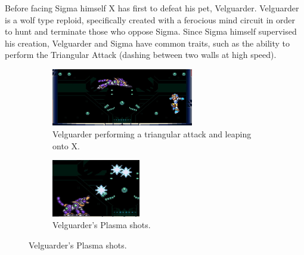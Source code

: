 Before facing Sigma himself X has first to defeat his pet, Velguarder.
Velguarder is a wolf type reploid, specifically created with a ferocious mind circuit in order to hunt and terminate those who oppose Sigma. Since Sigma himself supervised his creation, Velguarder and Sigma have common traits, such as the ability to perform the Triangular Attack (dashing between two walls at high speed).
\begin{figure}[htp]
	\centering
	\begin{subfigure}[t]{.49\linewidth}
		\centering
		\includegraphics[height=2.5cm]{figures/X1/Sigma_stages/Velguarder_leap_1.jpg}
		\caption{Velguarder performing a triangular attack and leaping onto X.}
	\end{subfigure}
	\begin{subfigure}[t]{0.40\linewidth}
		\centering
		\includegraphics[height=2.5cm]{figures/X1/Sigma_stages/Velguarder_plasma.jpg}
		\caption{Velguarder's Plasma shots.}
	\end{subfigure}
\end{figure}

